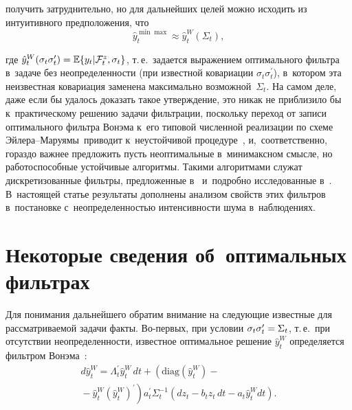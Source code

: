 \begin{multicols}{2}
     \noindent
получить затруднительно, но для дальнейших целей можно исходить из 
интуитивного предположения, что 
$$
\hat{y}_t^{\min\max} \approx \hat{y}_t^W(\Sigma_t),
$$

\noindent
 где $\hat{y}_t^W(\sigma_t \sigma_t^\prime) \hm= 
\mathbb{E}\{ y_t\vert \mathcal{F}_t^z, \sigma_t\}$, т.\,е.\ задается выражением 
оптимального фильт\-ра в~задаче без не\-опре\-де\-лен\-ности (при известной 
ковариации $\sigma_t\sigma_t^\prime$), в~котором эта неизвестная 
ковариация заменена \mbox{максимально} воз\-мож\-ной~$\Sigma_t$. На самом деле, 
даже если бы удалось доказать такое утверж\-де\-ние, это никак не при\-бли\-зи\-ло 
бы к~практическому решению задачи фильт\-ра\-ции, поскольку переход от 
записи оптимального фильт\-ра Вонэма к~его типовой чис\-лен\-ной реализации 
по схеме Эй\-ле\-ра--Ма\-ру\-ямы~\cite{14-bos}\linebreak приводит к~неустойчивой 
процедуре~\cite{15-bos}, и,~соответственно, гораздо важ\-нее предложить пусть 
неоптимальные в~минимаксном смыс\-ле, но работоспособные устойчивые 
алгоритмы. Такими \mbox{алгоритмами} служат дискретизованные фильтры, 
предложенные в~\cite{17-bos, 18-bos} и~подробно исследованные  
в~\cite{19-bos}. В~на\-сто\-ящей статье результаты дополнены анализом свойств 
этих фильт\-ров в~по\-ста\-нов\-ке с~не\-опре\-де\-лен\-ностью ин\-тен\-сив\-ности шума 
в~наблюдениях.

\vspace*{-6pt}

\section{Некоторые сведения об~оптимальных фильтрах}

     Для понимания дальнейшего обратим внимание на сле\-ду\-ющие 
известные для рас\-смат\-ри\-ва\-емой задачи факты. Во-пер\-вых, при условии 
$\sigma_t\sigma_t^\prime \hm= \Sigma_t$, т.\,е.\ при отсутствии 
не\-опре\-де\-лен\-ности, известное оптимальное решение $\hat{y}_t^W$ 
определяется фильт\-ром Вонэма~\cite{2-bos, 13-bos}:
     \begin{multline}
     d\hat{y}_t^W = \Lambda_t^\prime \hat{y}_t^W \,dt+ \left( 
\mathrm{diag}\left( \hat{y}_t^W\right) -{}\right.\\
\left.{}-\hat{y}_t^W \left( 
\hat{y}_t^W\right)^\prime \right) a_t^\prime \Sigma_t^{-1} \left( dz_t -b_t z_t \,dt -
a_t \hat{y}_t^W dt\right).
     \label{e3-bos}
     \end{multline}
     

\end{multicols}
